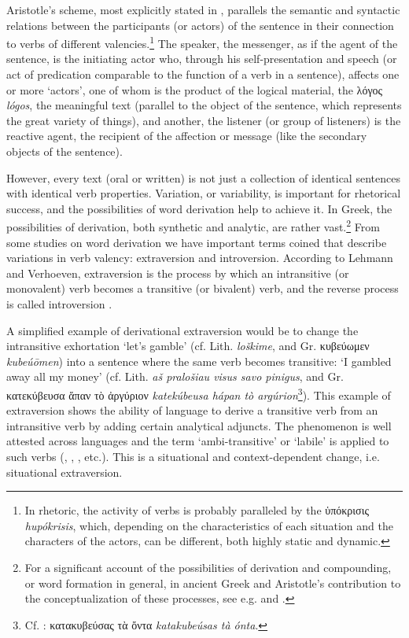 \documentclass[output=paper,colorlinks,citecolor=brown]{langscibook}
\begin{document}
Aristotle’s scheme, most explicitly stated in , parallels the semantic and syntactic relations between the participants (or actors) of the sentence in their connection to verbs of different valencies.\footnote{In rhetoric, the activity of verbs is probably paralleled by the ὑπόκρισις \textit{hupókrisis}, which, depending on the characteristics of each situation and the characters of the actors, can be different, both highly static and dynamic.} The speaker, the messenger, as if the agent of the sentence, is the initiating actor who, through his self-presentation and speech (or act of predication comparable to the function of a verb in a sentence), affects one or more ‘actors’, one of whom is the product of the logical material, the λόγος \textit{lógos}, the meaningful text (parallel to the object of the sentence, which represents the great variety of things), and another, the listener (or group of listeners) is the reactive agent, the recipient of the affection or message (like the secondary objects of the sentence). 

However, every text (oral or written) is not just a collection of identical sentences with identical verb properties. Variation, or variability, is important for rhetorical success, and the possibilities of word derivation help to achieve it. In Greek, the possibilities of derivation, both synthetic and analytic, are rather vast.\footnote{For a significant account of the possibilities of derivation and compounding, or word formation in general, in ancient Greek and Aristotle’s contribution to the conceptualization of these processes, see e.g. \citet{Wouters-etal2014} and \citet{Vaahtera2014}.} From some studies on word derivation we have important terms coined that describe variations in verb valency: extraversion and introversion. According to Lehmann and Verhoeven, extraversion is the process by which an intransitive (or monovalent) verb becomes a transitive (or bivalent) verb, and the reverse process is called introversion \citep[468--469]{Lehmann-Verhoeven2006}.


A simplified example of derivational extraversion would be to change the intransitive exhortation ‘let’s gamble’ (cf. Lith. \textit{loškime}, and Gr. κυβεύωμεν \textit{kubeúōmen}) into a sentence where the same verb becomes transitive: ‘I gambled away all my money’ (cf. Lith. \textit{aš pralošiau visus savo pinigus}, and Gr. κατεκύβευσα ἅπαν τὸ ἀργύριον \textit{katekúbeusa hápan tò argúrion}\footnote{Cf. : κατακυβεύσας τὰ ὄντα \textit{katakubeúsas tà ónta}.}). This example of extraversion shows the ability of language to derive a transitive verb from an intransitive verb by adding certain analytical adjuncts. The phenomenon is well attested across languages and the term ‘ambi-transitive’ or ‘labile’ is applied to such verbs (\citealt[57]{Arkadiev-Pakerys2015}, \citealt[68]{Lavidas2009}, \citealt[38]{Haspelmath2016}, etc.). This is a situational and context-dependent change, i.e. situational extraversion. 
\end{document}
